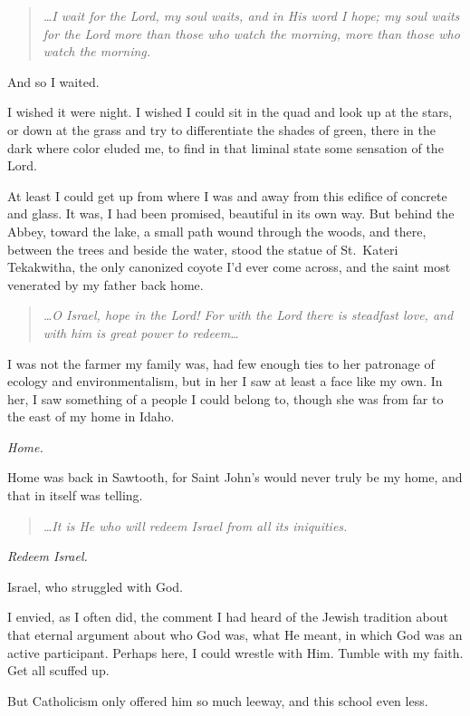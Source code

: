 \begin{quote}
\emph{\ldots I wait for the Lord, my soul waits, and in His word I hope; my soul waits for the Lord more than those who watch the morning, more than those who watch the morning.}
\end{quote}

And so I waited.

I wished it were night. I wished I could sit in the quad and look up at the stars, or down at the grass and try to differentiate the shades of green, there in the dark where color eluded me, to find in that liminal state some sensation of the Lord.

At least I could get up from where I was and away from this edifice of concrete and glass. It was, I had been promised, beautiful in its own way. But behind the Abbey, toward the lake, a small path wound through the woods, and there, between the trees and beside the water, stood the statue of St.~Kateri Tekakwitha, the only canonized coyote I'd ever come across, and the saint most venerated by my father back home.

\begin{quote}
\emph{\ldots O Israel, hope in the Lord! For with the Lord there is steadfast love, and with him is great power to redeem\ldots{}}
\end{quote}

I was not the farmer my family was, had few enough ties to her patronage of ecology and environmentalism, but in her I saw at least a face like my own. In her, I saw something of a people I could belong to, though she was from far to the east of my home in Idaho.

\emph{Home.}

Home was back in Sawtooth, for Saint John's would never truly be my home, and that in itself was telling.

\begin{quote}
\emph{\ldots It is He who will redeem Israel from all its iniquities.}
\end{quote}

\emph{Redeem Israel.}

Israel, who struggled with God.

I envied, as I often did, the comment I had heard of the Jewish tradition about that eternal argument about who God was, what He meant, in which God was an active participant. Perhaps here, I could wrestle with Him. Tumble with my faith. Get all scuffed up.

But Catholicism only offered him so much leeway, and this school even less.

